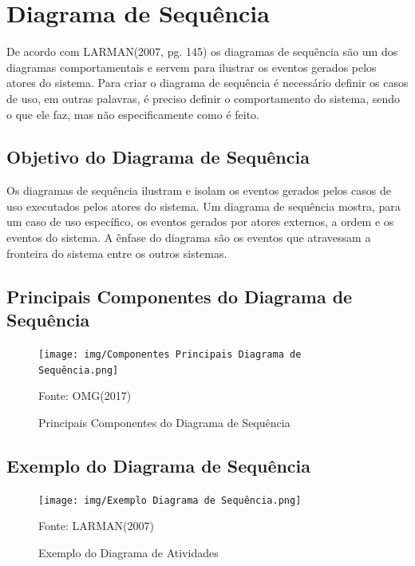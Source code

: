 \documentclass[12pt,openright,oneside,a4paper,
	chapter=TITLE,
	section=TITLE,
	english,brazil]{abntex2}
\begin{document}
\chapter{Diagrama de Sequência}

De acordo com LARMAN(2007, pg. 145) os diagramas de sequência são um dos diagramas comportamentais e servem para ilustrar os eventos gerados pelos atores do sistema. Para criar o diagrama de sequência é necessário definir os casos de uso, em outras palavras, é preciso definir o comportamento do sistema, sendo o que ele faz, mas não especificamente como é feito.

\section{Objetivo do Diagrama de Sequência}

Os diagramas de sequência ilustram e isolam os eventos gerados pelos casos de uso executados pelos atores do sistema. Um diagrama de sequência mostra, para um caso de uso específico, os eventos gerados por atores externos, a ordem e os eventos do sistema. A ênfase do diagrama são os eventos que atravessam a fronteira do sistema entre os outros sistemas.

\section{Principais Componentes do Diagrama de Sequência}

\begin{figure}[!htp]
	\caption{Principais Componentes do Diagrama de Sequência}
	\centering
	\texttt{[image: img/Componentes Principais Diagrama de Sequência.png]}
	\\

	\footnotesize\raggedright Fonte: OMG(2017)
\end{figure}

\section{Exemplo do Diagrama de Sequência}

\begin{figure}[!htp]
	\caption{Exemplo do Diagrama de Atividades}
	\centering
	\texttt{[image: img/Exemplo Diagrama de Sequência.png]}
	\\

	\label{ExemploSequencia}
	\footnotesize\raggedright Fonte: LARMAN(2007)
\end{figure}
\end{document}

